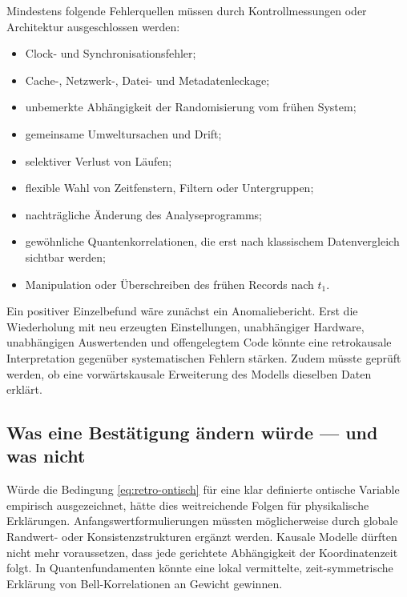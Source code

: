 \documentclass[11pt,a4paper]{article}
\theoremstyle{remark}
\begin{document}
Mindestens folgende Fehlerquellen müssen durch Kontrollmessungen oder
Architektur ausgeschlossen werden:
\begin{itemize}
  \item Clock- und Synchronisationsfehler;
  \item Cache-, Netzwerk-, Datei- und Metadatenleckage;
  \item unbemerkte Abhängigkeit der Randomisierung vom frühen System;
  \item gemeinsame Umweltursachen und Drift;
  \item selektiver Verlust von Läufen;
  \item flexible Wahl von Zeitfenstern, Filtern oder Untergruppen;
  \item nachträgliche Änderung des Analyseprogramms;
  \item gewöhnliche Quantenkorrelationen, die erst nach klassischem
  Datenvergleich sichtbar werden;
  \item Manipulation oder Überschreiben des frühen Records nach \(t_1\).
\end{itemize}

Ein positiver Einzelbefund wäre zunächst ein Anomaliebericht. Erst die
Wiederholung mit neu erzeugten Einstellungen, unabhängiger Hardware,
unabhängigen Auswertenden und offengelegtem Code könnte eine retrokausale
Interpretation gegenüber systematischen Fehlern stärken. Zudem müsste geprüft
werden, ob eine vorwärtskausale Erweiterung des Modells dieselben Daten
erklärt.

\subsection{Was eine Bestätigung ändern würde --- und was nicht}

Würde die Bedingung \eqref{eq:retro-ontisch} für eine klar definierte ontische Variable
empirisch ausgezeichnet, hätte dies weitreichende Folgen für physikalische
Erklärungen. Anfangswertformulierungen müssten möglicherweise durch globale
Randwert- oder Konsistenzstrukturen ergänzt werden. Kausale Modelle dürften
nicht mehr voraussetzen, dass jede gerichtete Abhängigkeit der
Koordinatenzeit folgt. In Quantenfundamenten könnte eine lokal vermittelte,
zeit-symmetrische Erklärung von Bell-Korrelationen an Gewicht gewinnen.
\end{document}
